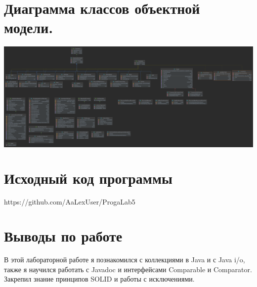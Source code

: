 \documentclass[12pt,onecolumn]{article}
\begin{document}
\section{Диаграмма классов объектной модели.}
\includegraphics[scale=0.09, angle=90]{UML.png}
\section{Исходный код программы}
https://github.com/AaLexUser/ProgaLab5
\section{Выводы по работе}

В этой лабораторной работе я познакомился с коллекциями в Java и с Java i/o, 
также я научился работать с Javadoc и интерфейсами Comparable и Comparator. Закрепил знание принципов SOLID и работы с исключениями.
\end{document}
